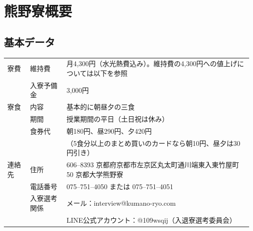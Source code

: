 \section{熊野寮概要} \label{sec:abst}

		\subsection{基本データ} \label{subsec:data}
		\begin{table}[htbp]
      \begin{tabular}{|l|l|l|}
      \hline
      寮費\index{りょうひ@寮費|seealsopage{維持費}}  & 維持費\index{いじひ@維持費|seealsopage{寮費}}    & 月4,300円（水光熱費込み）。維持費の4,300円への値上げについては以下を参照                    \\
          & 入寮予備金  & 3,000円                                                       \\ \hline
      寮食\index{りょうしょく@寮食}  & 内容     & 基本的に朝昼夕の三食                                                   \\
          & 期間     & 授業期間の平日（土日祝は休み）                \\
          & 食券代\index{りょうしょく@寮食!のねだん@---の値段}    & 朝180円、昼290円、夕420円 \\
         　&　& （5食分以上のまとめ買いのカードなら朝10円、昼夕は30円引き）         \\ \hline
      連絡先\index{くまのりょう@熊野寮!のれんらくさき@---の連絡先}
       & 住所\index{くまのりょう@熊野寮!のじゅうしょ@---の住所}   & 606--8393 京都府京都市左京区丸太町通川端東入東竹屋町50 京都大学熊野寮                     \\
          & 電話番号   & 075--751--4050 または 075--751--4051                                \\
          & 入寮選考関係\index{にゅうりょう@入寮!にかんするといあわせ@---に関する問い合わせ} & メール：interview@kumano-ryo.com \\
          　&　& LINE公式アカウント：@109wsqij（入退寮選考委員会） \\ \hline
      \end{tabular}
      \end{table}
